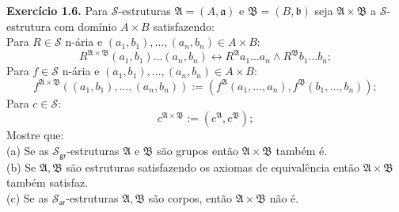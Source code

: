 \documentclass[11pt]{article}
\newcommand{\sse}{\leftrightarrow}
\newcommand{\mc}[1]{\mathcal{#1}}
\newcommand{\mf}[1]{\mathfrak{#1}}
\newcommand{\msf}[1]{\mathsf{#1}}
\begin{document}
\begin{shaded}
\textbf{Exercício 1.6.}
Para $\mc{S}$-estruturas $\mf{A}=(A,\mf{a})$ e $\mf{B}=(B,\mf{b})$ seja $\mf{A}\times\mf{B}$ a $\mc{S}$-estrutura com domínio $A\times B$ satisfazendo:\\
Para $R\in\mc{S}$ n-ária e $(a_1,b_1),\dots,(a_n,b_n)\in A\times B$:
\[
R^{\mf{A}\times\mf{B}}(a_1,b_1)\dots(a_n,b_n)\sse R^\mf{A}a_1\dots a_n\wedge R^\mf{B}b_1\dots b_n;
\]
Para $f\in\mc{S}$ n-ária e $(a_1,b_1),\dots,(a_n,b_n)\in A\times B$:
\[
f^{\mf{A}\times\mf{B}}((a_1,b_1),\dots,(a_n,b_n)):=(f^\mf{A}(a_1,\dots,a_n),f^\mf{B}(b_1,\dots,b_n));
\]
Para $c\in\mc{S}$:
\[
c^{\mf{A}\times\mf{B}}:=(c^\mf{A},c^\mf{B});
\]
Mostre que:\\
(a) Se as $\mc{S}_{\msf{gr}}$-estruturas $\mf{A}$ e $\mf{B}$ são grupos então $\mf{A}\times\mf{B}$ também é.\\
(b) Se $\mf{A},\mf{B}$ são estruturas satisfazendo os axiomas de equivalência então $\mf{A}\times\mf{B}$ também satisfaz.\\
(c) Se as $\mc{S}_{\msf{ar}}$-estruturas $\mf{A},\mf{B}$ são corpos, então $\mf{A}\times\mf{B}$ não é.
\end{shaded}
\end{document}
